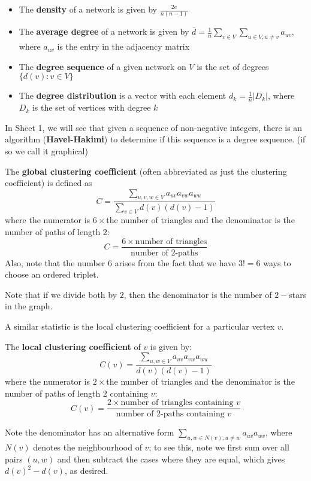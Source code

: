 \documentclass{article}
\begin{document}
\begin{itemize}
    \item  The \textbf{density} of a network is given by $\frac{2e}{n(n-1)}$
    \item The \textbf{average degree} of a network is given by $\bar{d}=\frac{1}{n}\sum_{v\in V} \sum_{u\in V, u\neq v} a_{uv}$, where $a_{uv}$ is the entry in the adjacency matrix
    \item The \textbf{degree sequence} of a given network on $V$ is the set of degrees $\{d(v): v\in V\}$
    \item The \textbf{degree distribution} is a vector with each element $d_k=\frac{1}{n} |D_k|$, where $D_k$ is the set of vertices with degree $k$
\end{itemize}
\begin{remark}
    In Sheet 1, we will see that given a sequence of non-negative integers, there is an algorithm (\textbf{Havel-Hakimi}) to determine if this sequence is a degree sequence. (if so we call it graphical)
\end{remark}

\begin{definition}
    The \textbf{global clustering coefficient} (often abbreviated as just the clustering coefficient) is defined as
    \begin{equation*}
        C = \frac{\sum_{u,v,w \in V} a_{uv}a_{vw}a_{wu}}{\sum_{v \in V} d(v)(d(v)-1)}
    \end{equation*}
    where the numerator is $6\times$the number of triangles and the denominator is the number of paths of length $2$:
    \[
        C = \frac{6\times \text{number of triangles}}{\text{number of 2-paths}}
    \]
    Also, note that the number $6$ arises from the fact that we have $3!=6$ ways to choose an ordered triplet.
\end{definition}

 Note that if we divide both by $2$, then the denominator is the number of $2-$stars in the graph.

A similar statistic is the local clustering coefficient for a particular vertex $v$.

\begin{definition}
    The \textbf{local clustering coefficient} of $v$ is given by:
    \begin{equation*}
        C(v) =  \frac{\sum_{u,w \in V} a_{uv}a_{vw}a_{wu}}{d(v)(d(v)-1)} 
    \end{equation*}
    where the numerator is $2\times$the number of triangles and the denominator is the number of paths of length $2$ containing $v$:
    \[
        C(v) = \frac{2\times \text{number of triangles containing } v}{\text{number of 2-paths containing }v}
    \]
\end{definition}
Note the denominator has an alternative form $\sum_{u, w \in N(v), u\neq w} a_{uv}a_{wv}$, where $N(v)$ denotes the neighbourhood of $v$; to see this, note we first sum over all pairs $(u,w)$ and then subtract the cases where they are equal, which gives $d(v)^2-d(v)$, as desired.
\end{document}
